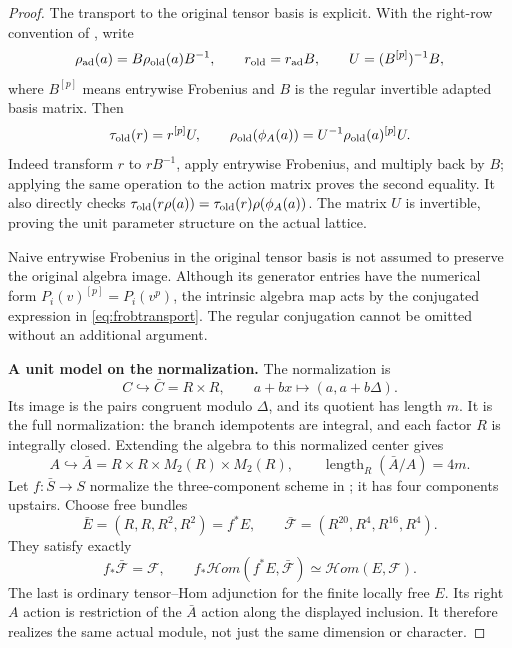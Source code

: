 \begin{proof}
The transport to the original tensor basis is explicit. With the
right-row convention of , write
\[
 \rho_{\rm ad}(a)=B\rho_{\rm old}(a)B^{-1},\qquad
 r_{\rm old}=r_{\rm ad}B,\qquad
 U=(B^{[p]})^{-1}B,
\]
where $B^{[p]}$ means entrywise Frobenius and $B$ is the regular
invertible adapted basis matrix. Then
\begin{equation}\label{eq:frobtransport}
 \tau_{\rm old}(r)=r^{[p]}U,\qquad
 \rho_{\rm old}(\phi_A(a))
       =U^{-1}\rho_{\rm old}(a)^{[p]}U.
\end{equation}
Indeed transform $r$ to $rB^{-1}$, apply entrywise Frobenius,
and multiply back by $B$; applying the same operation to the
action matrix proves the second equality. It also directly checks
$\tau_{\rm old}(r\rho(a))=\tau_{\rm old}(r)\rho(\phi_A(a))$.
The matrix $U$ is invertible, proving the unit parameter structure
on the actual lattice.

Naive entrywise Frobenius in the original tensor basis is not
assumed to preserve the original algebra image. Although its
generator entries have the numerical form $P_i(v)^{[p]}=P_i(v^p)$,
the intrinsic algebra map acts by the conjugated expression in
\eqref{eq:frobtransport}. The regular conjugation cannot be omitted
without an additional argument.

\par\smallskip\noindent\textbf{A unit model on the normalization.}\quad
The normalization is
\[
 C\hookrightarrow\bar C=R\times R,
 \qquad a+bx\longmapsto(a,a+b\Delta).
\]
Its image is the pairs congruent modulo $\Delta$, and its quotient
has length $m$. It is the full normalization: the branch idempotents
are integral, and each factor $R$ is integrally closed.
Extending the algebra to this normalized center gives
\[
 A\hookrightarrow\bar A
       =R\times R\times M_2(R)\times M_2(R),
 \qquad \operatorname{length}_R(\bar A/A)=4m.
\]
Let $f:\bar S\to S$ normalize the three-component scheme in
; it has four components upstairs. Choose free bundles
\[
 \bar E=(R,R,R^2,R^2)=f^*E,\qquad
 \bar{\mathcal F}=(R^{20},R^4,R^{16},R^4).
\]
They satisfy exactly
\[
 f_*\bar{\mathcal F}=\mathcal F,\qquad
 f_*\mathcal Hom(f^*E,\bar{\mathcal F})
       \simeq\mathcal Hom(E,\mathcal F).
\]
The last is ordinary tensor--Hom adjunction for the finite locally
free $E$. Its right $A$ action is restriction of the $\bar A$
action along the displayed inclusion. It therefore realizes the
same actual module, not just the same dimension or character.


\end{proof}
